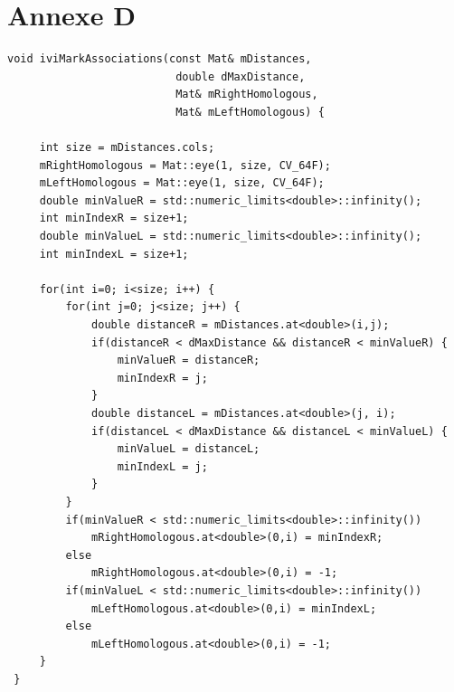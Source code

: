 \documentclass[a4paper,10pt]{article}
\begin{document}
\section{Annexe D}
\label{correspondance}
\begin{lstlisting}[caption=Correspondance entre les points des deux images]
 void iviMarkAssociations(const Mat& mDistances,
                          double dMaxDistance,
                          Mat& mRightHomologous,
                          Mat& mLeftHomologous) {
     
     int size = mDistances.cols;
     mRightHomologous = Mat::eye(1, size, CV_64F);
     mLeftHomologous = Mat::eye(1, size, CV_64F);
     double minValueR = std::numeric_limits<double>::infinity();
     int minIndexR = size+1;
     double minValueL = std::numeric_limits<double>::infinity();
     int minIndexL = size+1;
 
     for(int i=0; i<size; i++) {
         for(int j=0; j<size; j++) {
             double distanceR = mDistances.at<double>(i,j);
             if(distanceR < dMaxDistance && distanceR < minValueR) {
                 minValueR = distanceR;
                 minIndexR = j;
             }
             double distanceL = mDistances.at<double>(j, i);
             if(distanceL < dMaxDistance && distanceL < minValueL) {
                 minValueL = distanceL;
                 minIndexL = j;
             }
         }
         if(minValueR < std::numeric_limits<double>::infinity())
             mRightHomologous.at<double>(0,i) = minIndexR;
         else
             mRightHomologous.at<double>(0,i) = -1;
         if(minValueL < std::numeric_limits<double>::infinity())
             mLeftHomologous.at<double>(0,i) = minIndexL;
         else
             mLeftHomologous.at<double>(0,i) = -1;
     }
 }
\end{lstlisting}

 
\end{document}
